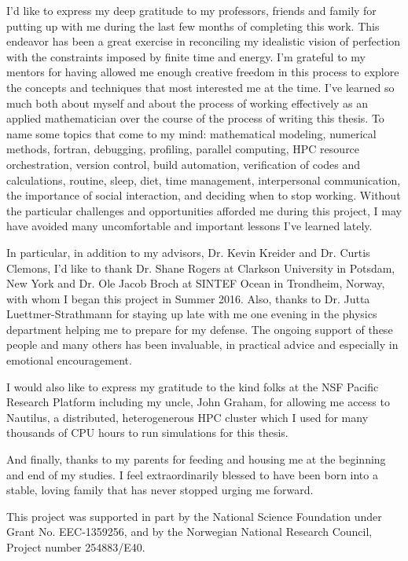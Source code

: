 \begin{acknowledgements}
I'd like to express my deep gratitude to my professors, friends and family for putting up with me during the last few months of completing this work.
This endeavor has been a great exercise in reconciling my idealistic vision of perfection with the constraints imposed by finite time and energy.
I'm grateful to my mentors for having allowed me enough creative freedom in this process to explore the concepts and techniques that most interested me at the time.
I've learned so much both about myself and about the process of working effectively as an applied mathematician over the course of the process of writing this thesis.
To name some topics that come to my mind: mathematical modeling, numerical methods, fortran, debugging, profiling, parallel computing, HPC resource orchestration, version control, build automation, verification of codes and calculations, routine, sleep, diet, time management, interpersonal communication, the importance of social interaction, and deciding when to stop working.
Without the particular challenges and opportunities afforded me during this project, I may have avoided many uncomfortable and important lessons I've learned lately.

In particular, in addition to my advisors, Dr. Kevin Kreider and Dr. Curtis Clemons, I'd like to thank Dr. Shane Rogers at Clarkson University in Potsdam, New York and Dr. Ole Jacob Broch at SINTEF Ocean in Trondheim, Norway, with whom I began this project in Summer 2016.
Also, thanks to Dr. Jutta Luettmer-Strathmann for staying up late with me one evening in the physics department helping me to prepare for my defense.
The ongoing support of these people and many others has been invaluable, in practical advice and especially in emotional encouragement.

I would also like to express my gratitude to the kind folks at the NSF Pacific Research Platform including my uncle, John Graham, for allowing me access to Nautilus, a distributed, heterogenerous HPC cluster which I used for many thousands of CPU hours to run simulations for this thesis.

And finally, thanks to my parents for feeding and housing me at the beginning and end of my studies.
I feel extraordinarily blessed to have been born into a stable, loving family that has never stopped urging me forward.

\vfill

This project was supported in part by the National Science
Foundation under Grant No. EEC-1359256, and by the Norwegian National Research
Council, Project number 254883/E40.

\end{acknowledgements}







